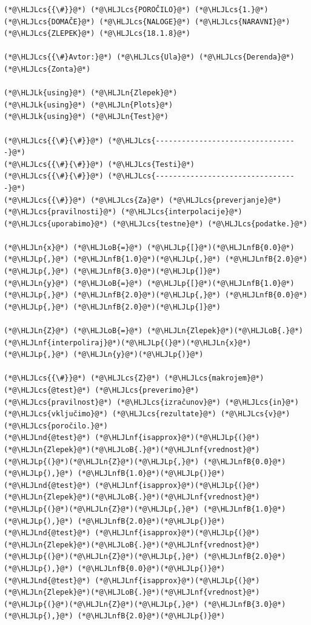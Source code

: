 \documentclass[12pt,a4paper]{article}
\newcommand{\HLJLk}[1]{\textcolor[RGB]{148,91,176}{\textbf{#1}}}
\newcommand{\HLJLn}[1]{#1}
\newcommand{\HLJLnd}[1]{\textcolor[RGB]{214,102,97}{#1}}
\newcommand{\HLJLnf}[1]{\textcolor[RGB]{66,102,213}{#1}}
\newcommand{\HLJLnfB}[1]{\textcolor[RGB]{59,151,46}{#1}}
\newcommand{\HLJLoB}[1]{\textcolor[RGB]{102,102,102}{\textbf{#1}}}
\newcommand{\HLJLp}[1]{#1}
\newcommand{\HLJLcs}[1]{\textcolor[RGB]{153,153,119}{\textit{#1}}}
\begin{document}
\begin{lstlisting}
(*@\HLJLcs{{\#}}@*) (*@\HLJLcs{POROČILO}@*) (*@\HLJLcs{1.}@*) (*@\HLJLcs{DOMAČE}@*) (*@\HLJLcs{NALOGE}@*) (*@\HLJLcs{NARAVNI}@*) (*@\HLJLcs{ZLEPEK}@*) (*@\HLJLcs{18.1.8}@*)

(*@\HLJLcs{{\#}Avtor:}@*) (*@\HLJLcs{Ula}@*) (*@\HLJLcs{Derenda}@*) (*@\HLJLcs{Zonta}@*)

(*@\HLJLk{using}@*) (*@\HLJLn{Zlepek}@*)
(*@\HLJLk{using}@*) (*@\HLJLn{Plots}@*)
(*@\HLJLk{using}@*) (*@\HLJLn{Test}@*)

(*@\HLJLcs{{\#}{\#}}@*) (*@\HLJLcs{---------------------------------}@*)
(*@\HLJLcs{{\#}{\#}}@*) (*@\HLJLcs{Testi}@*)
(*@\HLJLcs{{\#}{\#}}@*) (*@\HLJLcs{---------------------------------}@*)
(*@\HLJLcs{{\#}}@*) (*@\HLJLcs{Za}@*) (*@\HLJLcs{preverjanje}@*) (*@\HLJLcs{pravilnosti}@*) (*@\HLJLcs{interpolacije}@*) (*@\HLJLcs{uporabimo}@*) (*@\HLJLcs{testne}@*) (*@\HLJLcs{podatke.}@*)

(*@\HLJLn{x}@*) (*@\HLJLoB{=}@*) (*@\HLJLp{[}@*)(*@\HLJLnfB{0.0}@*)(*@\HLJLp{,}@*) (*@\HLJLnfB{1.0}@*)(*@\HLJLp{,}@*) (*@\HLJLnfB{2.0}@*)(*@\HLJLp{,}@*) (*@\HLJLnfB{3.0}@*)(*@\HLJLp{]}@*)
(*@\HLJLn{y}@*) (*@\HLJLoB{=}@*) (*@\HLJLp{[}@*)(*@\HLJLnfB{1.0}@*)(*@\HLJLp{,}@*) (*@\HLJLnfB{2.0}@*)(*@\HLJLp{,}@*) (*@\HLJLnfB{0.0}@*)(*@\HLJLp{,}@*) (*@\HLJLnfB{2.0}@*)(*@\HLJLp{]}@*)

(*@\HLJLn{Z}@*) (*@\HLJLoB{=}@*) (*@\HLJLn{Zlepek}@*)(*@\HLJLoB{.}@*)(*@\HLJLnf{interpoliraj}@*)(*@\HLJLp{(}@*)(*@\HLJLn{x}@*)(*@\HLJLp{,}@*) (*@\HLJLn{y}@*)(*@\HLJLp{)}@*)

(*@\HLJLcs{{\#}}@*) (*@\HLJLcs{Z}@*) (*@\HLJLcs{makrojem}@*) (*@\HLJLcs{@test}@*) (*@\HLJLcs{preverimo}@*) (*@\HLJLcs{pravilnost}@*) (*@\HLJLcs{izračunov}@*) (*@\HLJLcs{in}@*) (*@\HLJLcs{vključimo}@*) (*@\HLJLcs{rezultate}@*) (*@\HLJLcs{v}@*) (*@\HLJLcs{poročilo.}@*)
(*@\HLJLnd{@test}@*) (*@\HLJLnf{isapprox}@*)(*@\HLJLp{(}@*)(*@\HLJLn{Zlepek}@*)(*@\HLJLoB{.}@*)(*@\HLJLnf{vrednost}@*)(*@\HLJLp{(}@*)(*@\HLJLn{Z}@*)(*@\HLJLp{,}@*) (*@\HLJLnfB{0.0}@*)(*@\HLJLp{),}@*) (*@\HLJLnfB{1.0}@*)(*@\HLJLp{)}@*)
(*@\HLJLnd{@test}@*) (*@\HLJLnf{isapprox}@*)(*@\HLJLp{(}@*)(*@\HLJLn{Zlepek}@*)(*@\HLJLoB{.}@*)(*@\HLJLnf{vrednost}@*)(*@\HLJLp{(}@*)(*@\HLJLn{Z}@*)(*@\HLJLp{,}@*) (*@\HLJLnfB{1.0}@*)(*@\HLJLp{),}@*) (*@\HLJLnfB{2.0}@*)(*@\HLJLp{)}@*)
(*@\HLJLnd{@test}@*) (*@\HLJLnf{isapprox}@*)(*@\HLJLp{(}@*)(*@\HLJLn{Zlepek}@*)(*@\HLJLoB{.}@*)(*@\HLJLnf{vrednost}@*)(*@\HLJLp{(}@*)(*@\HLJLn{Z}@*)(*@\HLJLp{,}@*) (*@\HLJLnfB{2.0}@*)(*@\HLJLp{),}@*) (*@\HLJLnfB{0.0}@*)(*@\HLJLp{)}@*)
(*@\HLJLnd{@test}@*) (*@\HLJLnf{isapprox}@*)(*@\HLJLp{(}@*)(*@\HLJLn{Zlepek}@*)(*@\HLJLoB{.}@*)(*@\HLJLnf{vrednost}@*)(*@\HLJLp{(}@*)(*@\HLJLn{Z}@*)(*@\HLJLp{,}@*) (*@\HLJLnfB{3.0}@*)(*@\HLJLp{),}@*) (*@\HLJLnfB{2.0}@*)(*@\HLJLp{)}@*)


\end{lstlisting}
\end{document}
